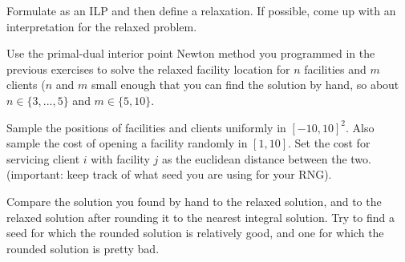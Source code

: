 Formulate as an ILP and then define a relaxation. If possible, come up with an
interpretation for the relaxed problem.



Use the primal-dual interior point Newton method you programmed in the previous
exercises to solve the relaxed facility location for $n$ facilities and $m$
clients ($n$ and $m$ small enough that you can find the solution by hand, so
about $n\in\{3,...,5\}$ and $m\in\{5, 10\}$.

Sample the positions of facilities and clients uniformly in $[-10, 10]^2$.
Also sample the cost of opening a facility randomly in $[1, 10]$. Set the
cost for servicing client $i$ with facility $j$ as the euclidean distance
between the two.  (important: keep track of what seed you are using for your
RNG).

Compare the solution you found by hand to the relaxed solution, and to the
relaxed solution after rounding it to the nearest integral solution.  Try to
find a seed for which the rounded solution is relatively good, and one for
which the rounded solution is pretty bad.

\exerfoot
